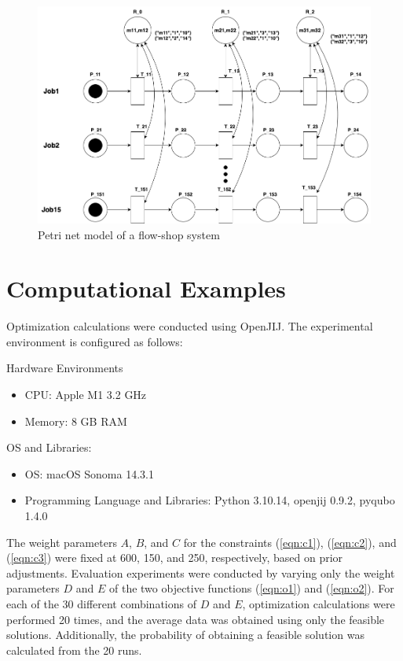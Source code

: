\documentclass[conference]{IEEEtran}
\begin{document}
\begin{figure}[htbp]
\centerline{\includegraphics[scale=0.25]{./fig/fsp.pdf}}
\caption{Petri net model of a flow-shop system}
\label{fig1}
\end{figure}


\section{Computational Examples} 
Optimization calculations were conducted using OpenJIJ. The experimental environment is configured as follows:

Hardware Environments 
\begin{itemize} 
\item CPU: Apple M1 3.2 GHz 
\item Memory: 8 GB RAM 
\end{itemize}

OS and Libraries: 
\begin{itemize} 
\item OS: macOS Sonoma 14.3.1 
\item Programming Language and Libraries: Python 3.10.14, openjij 0.9.2, pyqubo 1.4.0 
\end{itemize}

The weight parameters $A$, $B$, and $C$ for the constraints (\ref{eqn:c1}), (\ref{eqn:c2}), and (\ref{eqn:c3}) were fixed at 600, 150, and 250, respectively, based on prior adjustments. Evaluation experiments were conducted by varying only the weight parameters $D$ and $E$ of the two objective functions (\ref{eqn:o1}) and (\ref{eqn:o2}). 
For each of the 30 different combinations of $D$ and $E$, optimization calculations were performed 20 times, and the average data was obtained using only the feasible solutions. 
Additionally, the probability of obtaining a feasible solution was calculated from the 20 runs.
\end{document}
